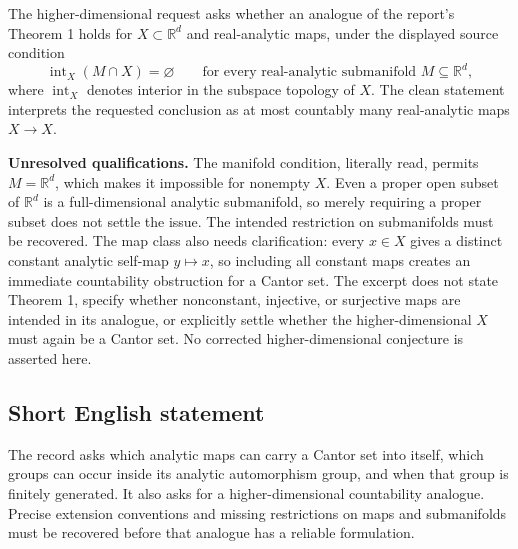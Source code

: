 \documentclass[11pt]{article}
\newcommand{\R}{\mathbb{R}}
\begin{document}
The higher-dimensional request asks whether an analogue of the report's Theorem 1 holds for \(X\subset\R^d\) and real-analytic maps, under the displayed source condition
\[
\operatorname{int}_X(M\cap X)=\varnothing
\qquad\text{for every real-analytic submanifold }M\subseteq\R^d,
\]
where \(\operatorname{int}_X\) denotes interior in the subspace topology of \(X\). The clean statement interprets the requested conclusion as at most countably many real-analytic maps \(X\to X\).

\textbf{Unresolved qualifications.} The manifold condition, literally read, permits \(M=\R^d\), which makes it impossible for nonempty \(X\). Even a proper open subset of \(\R^d\) is a full-dimensional analytic submanifold, so merely requiring a proper subset does not settle the issue. The intended restriction on submanifolds must be recovered. The map class also needs clarification: every \(x\in X\) gives a distinct constant analytic self-map \(y\mapsto x\), so including all constant maps creates an immediate countability obstruction for a Cantor set. The excerpt does not state Theorem 1, specify whether nonconstant, injective, or surjective maps are intended in its analogue, or explicitly settle whether the higher-dimensional \(X\) must again be a Cantor set. No corrected higher-dimensional conjecture is asserted here.
\subsection{Short English statement}
The record asks which analytic maps can carry a Cantor set into itself, which groups can occur inside its analytic automorphism group, and when that group is finitely generated. It also asks for a higher-dimensional countability analogue. Precise extension conventions and missing restrictions on maps and submanifolds must be recovered before that analogue has a reliable formulation.
\end{document}

